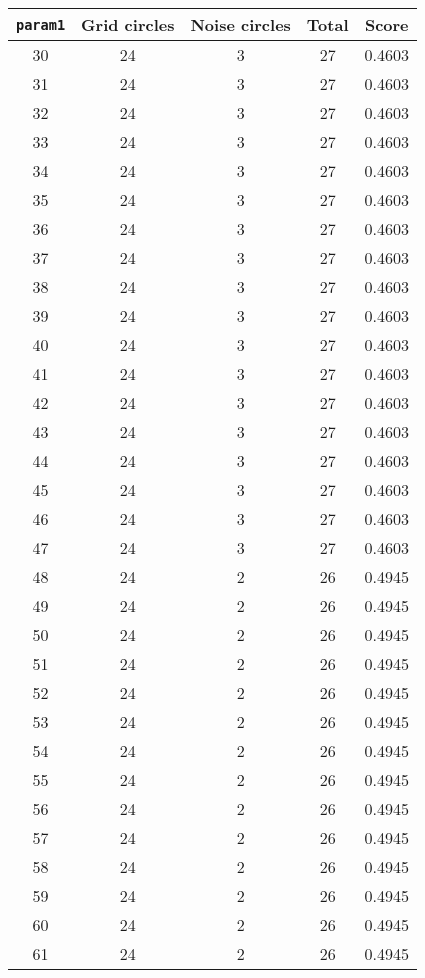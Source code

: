 \documentclass[letterpaper, 12pt]{article}
\begin{document}
\begin{longtable}{|c|c|c|c|c|}
\hline
\textbf{\texttt{param1}} & \textbf{Grid circles} & \textbf{Noise circles} & \textbf{Total} & \textbf{Score} \\
\hline
30 & 24 & 3 & 27 & 0.4603 \\
\hline
31 & 24 & 3 & 27 & 0.4603 \\
\hline
32 & 24 & 3 & 27 & 0.4603 \\
\hline
33 & 24 & 3 & 27 & 0.4603 \\
\hline
34 & 24 & 3 & 27 & 0.4603 \\
\hline
35 & 24 & 3 & 27 & 0.4603 \\
\hline
36 & 24 & 3 & 27 & 0.4603 \\
\hline
37 & 24 & 3 & 27 & 0.4603 \\
\hline
38 & 24 & 3 & 27 & 0.4603 \\
\hline
39 & 24 & 3 & 27 & 0.4603 \\
\hline
40 & 24 & 3 & 27 & 0.4603 \\
\hline
41 & 24 & 3 & 27 & 0.4603 \\
\hline
42 & 24 & 3 & 27 & 0.4603 \\
\hline
43 & 24 & 3 & 27 & 0.4603 \\
\hline
44 & 24 & 3 & 27 & 0.4603 \\
\hline
45 & 24 & 3 & 27 & 0.4603 \\
\hline
46 & 24 & 3 & 27 & 0.4603 \\
\hline
47 & 24 & 3 & 27 & 0.4603 \\
\hline
48 & 24 & 2 & 26 & 0.4945 \\
\hline
49 & 24 & 2 & 26 & 0.4945 \\
\hline
50 & 24 & 2 & 26 & 0.4945 \\
\hline
51 & 24 & 2 & 26 & 0.4945 \\
\hline
52 & 24 & 2 & 26 & 0.4945 \\
\hline
53 & 24 & 2 & 26 & 0.4945 \\
\hline
54 & 24 & 2 & 26 & 0.4945 \\
\hline
55 & 24 & 2 & 26 & 0.4945 \\
\hline
56 & 24 & 2 & 26 & 0.4945 \\
\hline
57 & 24 & 2 & 26 & 0.4945 \\
\hline
58 & 24 & 2 & 26 & 0.4945 \\
\hline
59 & 24 & 2 & 26 & 0.4945 \\
\hline
60 & 24 & 2 & 26 & 0.4945 \\
\hline
61 & 24 & 2 & 26 & 0.4945 \\

\end{longtable}
\end{document}
